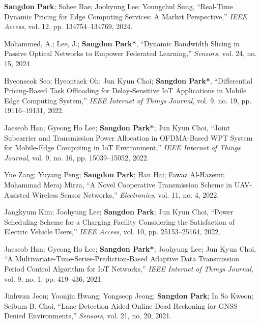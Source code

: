 \documentclass[11pt,a4paper]{article}
\begin{document}
\begin{enumerate}[label={[{\arabic*}]}, leftmargin=*, itemsep=0.3em]

\item \textbf{Sangdon Park}; Sohee Bae; Joohyung Lee; Youngchul Sung, ``Real-Time Dynamic Pricing for Edge Computing Services: A Market Perspective,'' \textit{IEEE Access}, vol. 12, pp. 134754--134769, 2024.

\item Mohammed, A.; Lee, J.; \textbf{Sangdon Park*}, ``Dynamic Bandwidth Slicing in Passive Optical Networks to Empower Federated Learning,'' \textit{Sensors}, vol. 24, no. 15, 2024.

\item Hyeonseok Seo; Hyeontaek Oh; Jun Kyun Choi; \textbf{Sangdon Park*}, ``Differential Pricing-Based Task Offloading for Delay-Sensitive IoT Applications in Mobile Edge Computing System,'' \textit{IEEE Internet of Things Journal}, vol. 9, no. 19, pp. 19116--19131, 2022.

\item Jaeseob Han; Gyeong Ho Lee; \textbf{Sangdon Park*}; Jun Kyun Choi, ``Joint Subcarrier and Transmission Power Allocation in OFDMA-Based WPT System for Mobile-Edge Computing in IoT Environment,'' \textit{IEEE Internet of Things Journal}, vol. 9, no. 16, pp. 15039--15052, 2022.

\item Yue Zang; Yuyang Peng; \textbf{Sangdon Park}; Han Hai; Fawaz Al-Hazemi; Mohammad Meraj Mirza, ``A Novel Cooperative Transmission Scheme in UAV-Assisted Wireless Sensor Networks,'' \textit{Electronics}, vol. 11, no. 4, 2022.

\item Jangkyum Kim; Joohyung Lee; \textbf{Sangdon Park}; Jun Kyun Choi, ``Power Scheduling Scheme for a Charging Facility Considering the Satisfaction of Electric Vehicle Users,'' \textit{IEEE Access}, vol. 10, pp. 25153--25164, 2022.

\item Jaeseob Han; Gyeong Ho Lee; \textbf{Sangdon Park*}; Joohyung Lee; Jun Kyun Choi, ``A Multivariate-Time-Series-Prediction-Based Adaptive Data Transmission Period Control Algorithm for IoT Networks,'' \textit{IEEE Internet of Things Journal}, vol. 9, no. 1, pp. 419--436, 2021.

\item Jinhwan Jeon; Yoonjin Hwang; Yongseop Jeong; \textbf{Sangdon Park}; In So Kweon; Seibum B. Choi, ``Lane Detection Aided Online Dead Reckoning for GNSS Denied Environments,'' \textit{Sensors}, vol. 21, no. 20, 2021.


\end{enumerate}
\end{document}
